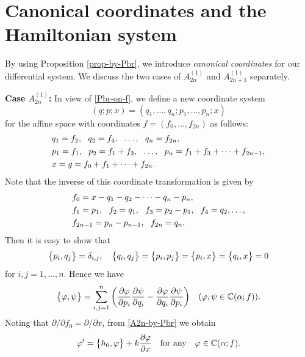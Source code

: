 \section{Canonical coordinates and the Hamiltonian system}
By using Proposition \ref{prop-by-Pbr}, we introduce {\em canonical coordinates}
for our differential system. 
We discuss the two cases of $A^{(1)}_{2n}$ and $A^{(1)}_{2n+1}$ separately.

\par\medskip\noindent
{\bf Case $A^{(1)}_{2n}$: }\quad
In view of \eqref{Pbr-on-f},
we define a new coordinate system 
\begin{equation}
(q;p;x)=(q_1,\dots,q_n;p_1,\ldots,p_n;x)
\end{equation}
for the affine space with coordinates $f=(f_0,\ldots,f_{2n})$ as 
follows:
\begin{equation}
\begin{align}
&q_1=f_2, \ \ q_2=f_4, \ \  \ldots, \ \ q_n=f_{2n},\\ 
&p_1=f_1, \ \ p_2=f_1+f_3,\ \  \ldots,\ \  p_n=f_1+f_3+\cdots+f_{2n-1},\notag\\
&x=g=f_0+f_1+\cdots+f_{2n}. \notag
\end{align}
\end{equation} 
Note that the inverse of this coordinate transformation is given by
\begin{equation}\Label{f-in-qp-2n}
\begin{align}
&f_0=x-q_1-q_2-\cdots-q_n-p_n,\\
&f_1=p_1,\ \  f_2=q_1, \ \ f_3=p_2-p_1, \ \ f_4=q_2,\ldots,\notag\\
&f_{2n-1}=p_n-p_{n-1}, \ \ f_{2n}=q_n.\notag
\end{align}
\end{equation}
Then it is easy to show that 
\begin{equation}
\big\{{ p_i,q_j }\big\}=\delta_{i,j},\quad 
\big\{{ q_i,q_j }\big\}=\big\{{ p_i,p_j }\big\}=\big\{{ p_i,x }\big\}=\big\{{ q_i,x }\big\}=0 
\end{equation}
for $i,j=1,\ldots,n$.  
Hence we have
\begin{equation}\Label{Pbr-can}
\Pbr{\varphi,\psi}=\sum_{i,j=1}^n \bigg(
\frac{\partial\varphi}{\partial p_i}\frac{\partial \psi}{\partial q_i}
-\frac{\partial\varphi}{\partial q_i}\frac{\partial \psi}{\partial p_i}\bigg)
\quad (\varphi,\psi\in\BC(\alpha;f)). 
\end{equation}
Noting that $\partial/\partial f_0=\partial/\partial x$, 
from \eqref{A2n-by-Pbr} we obtain
\begin{equation}
\varphi'=\big\{{ h_0,\varphi }\big\} + k \frac{\partial\varphi}{\partial x}
\quad\text{for any}\quad \varphi\in{\Bbb C}(\alpha;f).
\end{equation}
